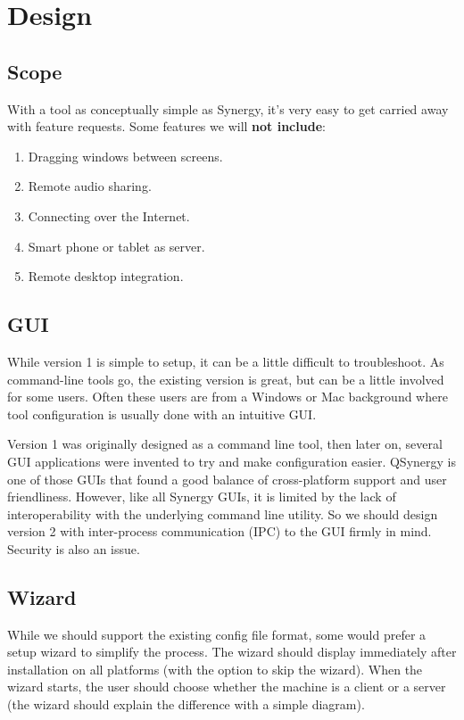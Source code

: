 \section{Design}

\subsection{Scope}

With a tool as conceptually simple as Synergy, it's very easy to get carried
away with feature requests. Some features we will \textbf{not include}:

\begin{enumerate}
  \item Dragging windows between screens.
  \item Remote audio sharing.
  \item Connecting over the Internet.
  \item Smart phone or tablet as server.
  \item Remote desktop integration.
\end{enumerate}

\subsection{GUI}

While version 1 is simple to setup, it can be a little difficult to
troubleshoot. As command-line tools go, the existing version is great, but
can be a little involved for some users. Often these users are from a Windows
or Mac background where tool configuration is usually done with an intuitive
GUI.

Version 1 was originally designed as a command line tool, then later on, several
GUI applications were invented to try and make configuration easier. QSynergy is
one of those GUIs that found a good balance of cross-platform support and user 
friendliness. However, like all Synergy GUIs, it is limited by the lack of 
interoperability with the underlying command line utility. So we should design 
version 2 with inter-process communication (IPC) to the GUI firmly in mind. 
Security is also an issue.

\subsection{Wizard}

While we should support the existing config file format, some would prefer a
setup wizard to simplify the process. The wizard should display immediately
after installation on all platforms (with the option to skip the wizard). When
the wizard starts, the user should choose whether the machine is a client or a
server (the wizard should explain the difference with a simple diagram).

